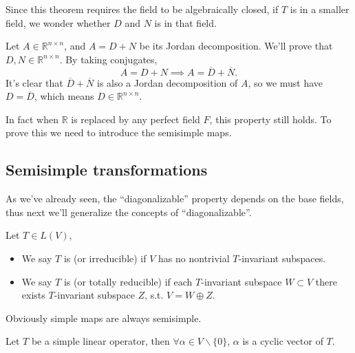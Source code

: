 Since this theorem requires the field to be
algebraically closed, if $T$ is in a smaller field,
we wonder whether $D$ and $N$ is in that field.

Let $A\in \mathbb{R}^{n\times n}$, and $A = D + N$ be
its Jordan decomposition. We'll prove that
$D,N\in \mathbb{R}^{n\times n}$.
By taking conjugates,
\[
A = D + N \implies A = \overline{D} + \overline{N}.
\]
It's clear that $\overline{D} + \overline{N}$ is also
a Jordan decomposition of $A$, so we must have $D = \overline{D}$,
which means $D\in \mathbb{R}^{n\times n}$.

In fact when $\mathbb{R}$ is replaced by any perfect field $F$,
this property still holds.
To prove this we need to introduce the semisimple maps.

\subsection{Semisimple transformations}
\label{sub:Semisimple transformations}
As we've already seen, the ``diagonalizable'' property depends
on the base fields, thus next we'll generalize the concepts
of ``diagonalizable''.

\begin{definition}
	Let $T\in L(V)$,
	\begin{itemize}
		\item We say $T$ is (or irreducible) if $V$ has
			no nontrivial $T$-invariant subspaces.
		\item We say $T$ is (or totally reducible)
			if each $T$-invariant subspace
			$W \subset V$ there exists $T$-invariant subspace $Z$,
			s.t. $V = W\oplus Z$.
	\end{itemize}
\end{definition}
Obviously simple maps are always semisimple.

\begin{proposition}
	Let $T$ be a simple linear operator, then $\forall \alpha\in V\backslash\{0\}$,
	$\alpha$ is a cyclic vector of $T$.
\end{proposition}

